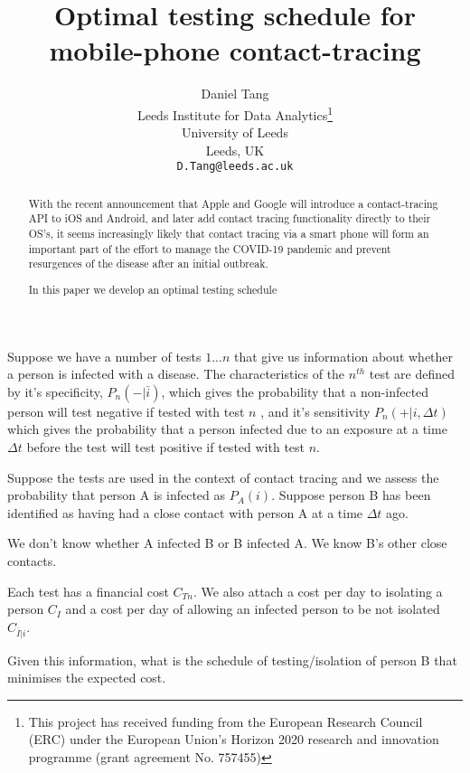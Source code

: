 \documentclass{article}
\title{Optimal testing schedule for mobile-phone contact-tracing}
\author{
  Daniel Tang\\
  Leeds Institute for Data Analytics\thanks{This project has received funding from the European Research Council (ERC) under the European Union’s Horizon 2020 research and innovation programme (grant agreement No. 757455)}\\
  University of Leeds\\
  Leeds, UK\\
  \texttt{D.Tang@leeds.ac.uk} \\
}
\begin{document}
\maketitle

\begin{abstract}
With the recent announcement\cite{applegoogle} that Apple and Google will introduce a contact-tracing API to iOS and Android, and later add contact tracing functionality directly to their OS's, it seems increasingly likely that contact tracing via a smart phone will form an important part of the effort to manage the COVID-19 pandemic and prevent resurgences of the disease after an initial outbreak.

In this paper we develop an optimal testing schedule 
\end{abstract}


Suppose we have a number of tests $1...n$ that give us information about whether a person is infected with a disease. The characteristics of the $n^{th}$ test are defined by it's specificity, $P_n(-|\bar{i})$, which gives the probability that a non-infected person will test negative if tested with test $n$ , and it's sensitivity $P_n(+|i,\Delta t)$ which gives the probability that a person infected due to an exposure at a time $\Delta t$ before the test will test positive if tested with test $n$.

Suppose the tests are used in the context of contact tracing and we assess the probability that person A is infected as $P_A(i)$. Suppose person B has been identified as having had a close contact with person A at a time $\Delta t$ ago.

We don't know whether A infected B or B infected A. We know B's other close contacts.

Each test has a financial cost $C_{Tn}$. We also attach a cost per day to isolating a person $C_I$ and a cost per day of allowing an infected person to be not isolated $C_{\bar{I}|i}$.

Given this information, what is the schedule of testing/isolation of person B that minimises the expected cost.
\end{document}
